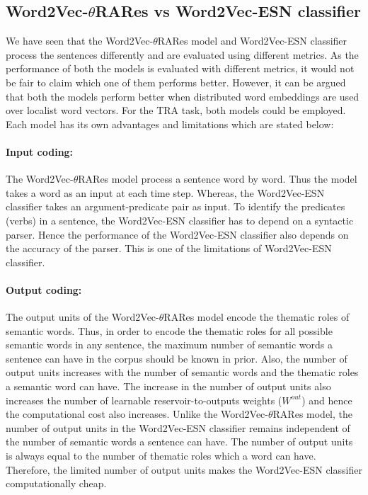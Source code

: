\subsection{Word2Vec-$\theta$RARes vs Word2Vec-ESN classifier}

We have seen that the Word2Vec-$\theta$RARes model and Word2Vec-ESN classifier process the sentences differently and are evaluated using different metrics. As the performance of both the models is evaluated with different metrics, it would not be fair to claim which one of them performs better. However, it can be argued that both the models perform better when distributed word embeddings are used over localist word vectors. For the TRA task, both models could be employed. Each model has its own advantages and limitations which are stated below:

\paragraph{Input coding:} The Word2Vec-$\theta$RARes model process a sentence word by word. Thus the model takes a word as an input at each time step. Whereas, the Word2Vec-ESN classifier takes an argument-predicate pair as input. To identify the predicates (verbs) in a sentence, the Word2Vec-ESN classifier has to depend on a syntactic parser. Hence the performance of the Word2Vec-ESN classifier also depends on the accuracy of the parser. This is one of the limitations of Word2Vec-ESN classifier.

\paragraph{Output coding:} The output units of the Word2Vec-$\theta$RARes model encode the thematic roles of semantic words. Thus, in order to encode the thematic roles for all possible semantic words in any sentence, the maximum number of semantic words a sentence can have in the corpus should be known in prior. Also, the number of output units increases with the number of semantic words and the thematic roles a semantic word can have. The increase in the number of output units also increases the number of learnable reservoir-to-outputs weights ($W^{out}$) and hence the computational cost also increases. Unlike the Word2Vec-$\theta$RARes model, the number of output units in the Word2Vec-ESN classifier remains independent of the number of semantic words a sentence can have. The number of output units is always equal to the number of thematic roles which a word can have. Therefore, the limited number of output units makes the Word2Vec-ESN classifier computationally cheap. 

